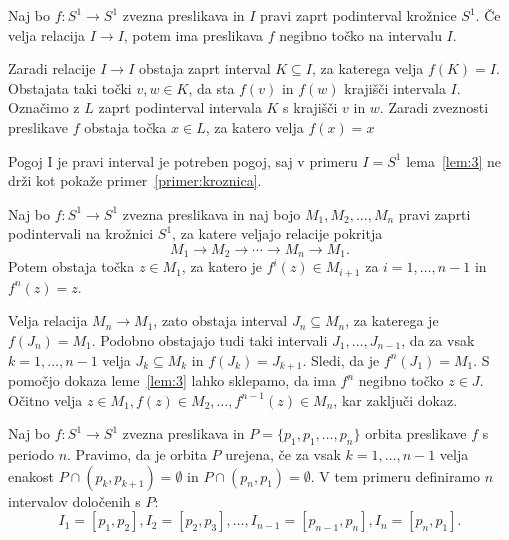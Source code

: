 \documentclass[../TG_magistrsko_delo_sections.tex]{subfiles}
\begin{document}
\begin{lema}\label{lem:3}		%
Naj bo $f : S^1 \to S^1$ zvezna preslikava in $I$ pravi zaprt podinterval krožnice $S^1$. Če velja relacija $I \to I$, potem ima preslikava $f$ negibno točko na intervalu $I$.
\end{lema}

\begin{dokaz}
Zaradi relacije $I \to I$ obstaja zaprt interval $K \subseteq I$, za katerega velja $f(K) = I$. Obstajata taki točki $v, w \in K$, da sta $f(v)$ in $f(w)$ krajišči intervala $I$. Označimo z $L$ zaprt podinterval intervala $K$ s krajišči $v$ in $w$. Zaradi zveznosti preslikave $f$ obstaja točka $x \in L$, za katero velja $f(x) = x$
\end{dokaz}

\begin{opomba}
Pogoj I je pravi interval je potreben pogoj, saj v primeru $I=S^1$ lema~\ref{lem:3} ne drži kot pokaže primer~\ref{primer:kroznica}.
\end{opomba}

\begin{lema}\label{lem:4}				%
Naj bo $f : S^1 \to S^1$ zvezna preslikava in naj bojo $M_1, M_2, \dots, M_n$ pravi zaprti podintervali na krožnici $S^1$, za katere veljajo relacije pokritja 
$$M_1 \to M_2 \to \cdots \to M_n \to M_1.$$ 
Potem obstaja točka $z \in M_1$, za katero je $f^i(z) \in M_{i+1}$ za $i = 1, \dots, n-1$ in $f^n(z) =z$. 
\end{lema}

\begin{dokaz}
Velja relacija $M_n \to M_1$, zato obstaja interval $J_n \subseteq M_n$, za katerega je $f(J_n) = M_1$. Podobno obstajajo tudi taki intervali $J_1, \dots, J_{n-1}$, da za vsak $k = 1, \dots, n-1$ velja $J_k \subseteq M_k$ in $f(J_k) = J_{k+1}$. Sledi, da je $f^n(J_1) = M_1$. S pomočjo dokaza leme~\ref{lem:3} lahko sklepamo, da ima $f^n$ negibno točko $z \in J$. Očitno velja $z \in M_1, f(z) \in M_2, \dots, f^{n-1}(z) \in M_n$, kar zaključi dokaz.
\end{dokaz}

\begin{definicija}
Naj bo $f: S^1 \to S^1$ zvezna preslikava in $P =\{p_1, p_1, \dots, p_n \}$ orbita preslikave $f$ s periodo $n$. Pravimo, da je orbita $P$ urejena, če za vsak $k=1, \dots, n-1$ velja enakost $P \cap (p_k, p_{k+1}) = \emptyset$ in $P \cap (p_n, p_1) = \emptyset$. V tem primeru definiramo $n$ intervalov določenih s $P$:
$$I_1 = [p_1, p_2], I_2 = [p_2, p_3], \dots, I_{n-1} = [p_{n-1}, p_n], I_n = [p_n, p_1].$$
\end{definicija}
\end{document}

